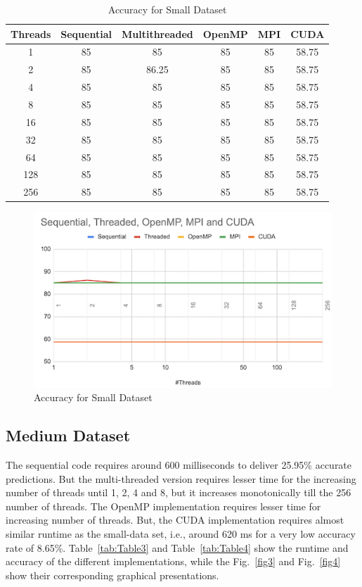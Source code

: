 \documentclass[conference]{IEEEtran}
\begin{document}
\begin{table}
    \begin{tabular}{||c | c | c | c | c | c||} 
     \hline
     Threads & Sequential & Multithreaded & OpenMP & MPI & CUDA \\ [0.2ex] 
     \hline\hline
    1 & 85 & 85 & 85 & 85 & 58.75\\ [1ex] 
     \hline
    2 & 85 & 86.25 & 85 & 85 & 58.75\\ [1ex] 
     \hline
    4 & 85 & 85 & 85 & 85 &  58.75\\ [1ex] 
     \hline
    8 & 85 & 85 & 85 & 85 & 58.75\\ [1ex] 
     \hline
    16 & 85 & 85 & 85 & 85 & 58.75\\ [1ex] 
     \hline
    32 & 85 & 85 & 85 & 85 & 58.75\\ [1ex] 
     \hline
    64 & 85 & 85 & 85 & 85 & 58.75\\ [1ex] 
     \hline
    128 & 85 & 85 & 85 & 85 & 58.75\\ [1ex] 
     \hline
    256 & 85 & 85 & 85 & 85 & 58.75\\ [1ex] 
     \hline
    \end{tabular}
\caption{\label{tab:Table2}Accuracy for Small Dataset}
\end{table}

\begin{figure}[htbp]
\centerline{\includegraphics{report/acc_small_set.png}}
\caption{Accuracy for Small Dataset}
\label{fig2}
\end{figure}

\subsection{Medium Dataset}
The sequential code requires around 600 milliseconds to deliver 25.95\% accurate predictions. But the multi-threaded version requires lesser time for the increasing number of threads until 1, 2, 4 and 8, but it increases monotonically till the 256 number of threads. The OpenMP implementation requires lesser time for increasing number of threads. But, the CUDA implementation requires almost similar runtime as the small-data set, i.e., around 620 ms for a very low accuracy rate of 8.65\%. 
Table~\ref{tab:Table3} and Table~\ref{tab:Table4} show the runtime and accuracy of the different implementations, while the Fig.~\ref{fig3} and Fig.~\ref{fig4} show their corresponding graphical presentations.
\end{document}
